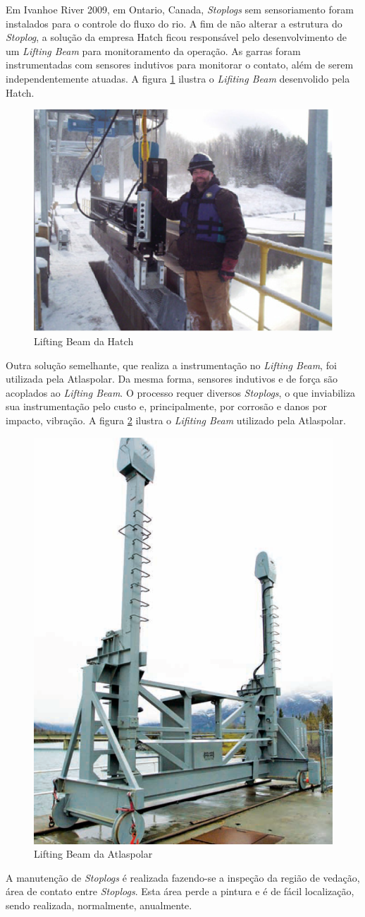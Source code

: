 Em Ivanhoe River 2009, em Ontario, Canada, \emph{Stoplogs} sem sensoriamento foram 
instalados para o controle do fluxo do rio. A fim de não alterar a estrutura do \emph{Stoplog}, 
a solução da empresa Hatch ficou responsável pelo desenvolvimento de um \emph{Lifting Beam} 
para monitoramento da operação. As garras foram instrumentadas com sensores indutivos 
para monitorar o contato, além de serem independentemente atuadas. A figura
\ref{pesqbib_9} ilustra o \emph{Lifiting Beam} desenvolido pela Hatch.

\begin{figure}[H]
    \centering
    \includegraphics[width=0.5\columnwidth]{figs/pesqbib/9.png}
    \caption{Lifting Beam da Hatch}
    \label{pesqbib_9}
\end{figure}  
 
 
Outra solução semelhante, que realiza a instrumentação no \emph{Lifting Beam}, foi utilizada pela Atlaspolar.
Da mesma forma, sensores indutivos e de força são acoplados ao \emph{Lifting
Beam}. O processo requer diversos \emph{Stoplogs}, o que inviabiliza sua instrumentação 
pelo custo e, principalmente, por corrosão e danos por impacto, vibração. A
figura \ref{pesqbib_10} ilustra o \emph{Lifiting Beam} utilizado pela
Atlaspolar.

\begin{figure}[H]
    \centering
    \includegraphics[width=0.5\columnwidth]{figs/pesqbib/10.png}
    \caption{Lifting Beam da Atlaspolar}
    \label{pesqbib_10}
\end{figure}   

A manutenção de \emph{Stoplogs} é realizada fazendo-se a inspeção da região de vedação, área de contato entre \emph{Stoplogs}. Esta área perde a pintura e é de fácil localização, sendo realizada, normalmente, anualmente.
